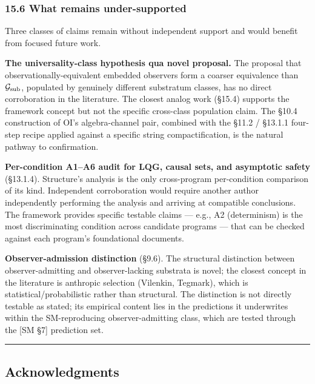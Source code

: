 \documentclass[
]{article}
\begin{document}
\hypertarget{what-remains-under-supported}{%
\subsubsection{15.6 What remains
under-supported}\label{what-remains-under-supported}}

Three classes of claims remain without independent support and would
benefit from focused future work.

\textbf{The universality-class hypothesis qua novel proposal.} The
proposal that observationally-equivalent embedded observers form a
coarser equivalence than \(\mathcal{G}_{\rm sub}\), populated by
genuinely different substratum classes, has no direct corroboration in
the literature. The closest analog work (§15.4) supports the framework
concept but not the specific cross-class population claim. The §10.4
construction of OI's algebra-channel pair, combined with the §11.2 /
§13.1.1 four-step recipe applied against a specific string
compactification, is the natural pathway to confirmation.

\textbf{Per-condition A1--A6 audit for LQG, causal sets, and asymptotic
safety} (§13.1.4). Structure's analysis is the only cross-program
per-condition comparison of its kind. Independent corroboration would
require another author independently performing the analysis and
arriving at compatible conclusions. The framework provides specific
testable claims --- e.g., A2 (determinism) is the most discriminating
condition across candidate programs --- that can be checked against each
program's foundational documents.

\textbf{Observer-admission distinction} (§9.6). The structural
distinction between observer-admitting and observer-lacking substrata is
novel; the closest concept in the literature is anthropic selection
(Vilenkin, Tegmark), which is statistical/probabilistic rather than
structural. The distinction is not directly testable as stated; its
empirical content lies in the predictions it underwrites within the
SM-reproducing observer-admitting class, which are tested through the
{[}SM §7{]} prediction set.

\begin{center}\rule{0.5\linewidth}{0.5pt}\end{center}

\hypertarget{acknowledgments}{%
\subsection{Acknowledgments}\label{acknowledgments}}
\end{document}
